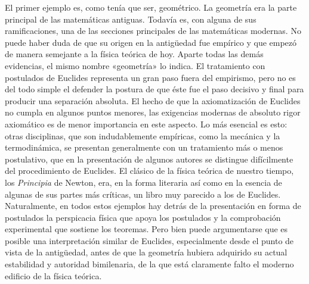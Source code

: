 \documentclass[a4paper, 12pt]{article}
\begin{document}
El primer ejemplo es, como tenía que ser, geométrico. La geometría era la parte principal de las matemáticas antiguas. Todavía es, con alguna de sus ramificaciones, una de las secciones principales de las matemáticas modernas. No puede haber duda de que su origen en la antigüedad fue empírico y que empezó de manera semejante a la física teórica de hoy. Aparte todas las demás evidencias, el mismo nombre «geometría» lo indica. El tratamiento con postulados de Euclides representa un gran paso fuera del empirismo, pero no es del todo simple el defender la postura de que éste fue el paso decisivo y final para producir una separación absoluta. El hecho de que la axiomatización de Euclides no cumpla en algunos puntos menores, las exigencias modernas de absoluto rigor axiomático es de menor 
importancia en este aspecto. Lo más esencial es esto: otras disciplinas, que son indudablemente empíricas, como la mecánica y la termodinámica, se presentan generalmente con un tratamiento más o menos postulativo, que en la presentación de algunos autores se distingue difícilmente del procedimiento de Euclides. El clásico de la física teórica de nuestro tiempo, los \textit{Principia} de Newton, era, en la forma literaria así como en la esencia de algunas de sus partes más críticas, un libro muy parecido a los de Euclides. Naturalmente, en todos estos ejemplos hay detrás de la presentación en forma de postulados la perspicacia física que apoya los postulados y la comprobación experimental que sostiene los teoremas. Pero bien puede argumentarse que es posible una interpretación similar de Euclides, especialmente desde el punto de vista de la antigüedad, antes de que la geometría hubiera adquirido su actual estabilidad y autoridad bimilenaria, de la que está claramente falto el moderno edificio de la física teórica.
\end{document}
